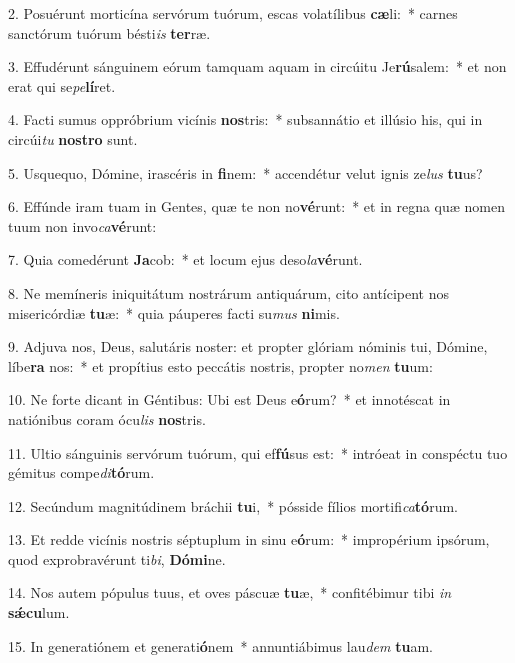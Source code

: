 2. Posuérunt morticína servórum tuórum, escas volatílibus \textbf{cæ}li:~*  carnes sanctórum tuórum bésti\textit{is} \textbf{ter}ræ.\

3. Effudérunt sánguinem eórum tamquam aquam in circúitu Je\textbf{rú}salem:~*  et non erat qui se\textit{pe}\textbf{lí}ret.\

4. Facti sumus oppróbrium vicínis \textbf{nos}tris:~*  subsannátio et illúsio his, qui in circúi\textit{tu} \textbf{nos}\textbf{tro} sunt.\

5. Usquequo, Dómine, irascéris in \textbf{fi}nem:~*  accendétur velut ignis ze\textit{lus} \textbf{tu}us?\

6. Effúnde iram tuam in Gentes, quæ te non no\textbf{vé}runt:~*  et in regna quæ nomen tuum non invo\textit{ca}\textbf{vé}runt:\

7. Quia comedérunt \textbf{Ja}cob:~*  et locum ejus deso\textit{la}\textbf{vé}runt.\

8. Ne memíneris iniquitátum nostrárum antiquárum, cito antícipent nos misericórdiæ \textbf{tu}æ:~*  quia páuperes facti su\textit{mus} \textbf{ni}mis.\

9. Adjuva nos, Deus, salutáris noster: et propter glóriam nóminis tui, Dómine, líbe\textbf{ra} nos:~*  et propítius esto peccátis nostris, propter no\textit{men} \textbf{tu}um:\

10. Ne forte dicant in Géntibus: Ubi est Deus e\textbf{ó}rum?~*  et innotéscat in natiónibus coram ócu\textit{lis} \textbf{nos}tris.\

11. Ultio sánguinis servórum tuórum, qui ef\textbf{fú}sus est:~*  intróeat in conspéctu tuo gémitus compe\textit{di}\textbf{tó}rum.\

12. Secúndum magnitúdinem bráchii \textbf{tu}i,~*  pósside fílios mortifi\textit{ca}\textbf{tó}rum.\

13. Et redde vicínis nostris séptuplum in sinu e\textbf{ó}rum:~*  impropérium ipsórum, quod exprobravérunt ti\textit{bi}, \textbf{Dó}\textbf{mi}ne.\

14. Nos autem pópulus tuus, et oves páscuæ \textbf{tu}æ,~*  confitébimur tibi \textit{in} \textbf{sǽ}\textbf{cu}lum.\

15. In generatiónem et generati\textbf{ó}nem~*  annuntiábimus lau\textit{dem} \textbf{tu}am.\

